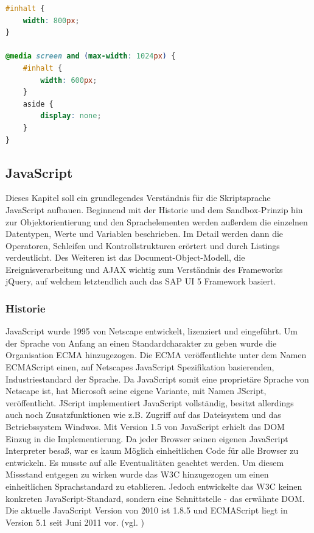 \vspace{1em}
\begin{lstlisting}[language=CSS, caption=CSS3 eigenschaftsspezifisches Stylesheet, label=lst:css3mediaquery]
#inhalt {
	width: 800px;
}
 
@media screen and (max-width: 1024px) {
	#inhalt {
		width: 600px;
	}
	aside {
		display: none;
	}
}
\end{lstlisting}

\subsection{JavaScript}
Dieses Kapitel soll ein grundlegendes Verständnis für die Skriptsprache JavaScript aufbauen. Beginnend mit der Historie und dem Sandbox-Prinzip hin zur Objektorientierung und den Sprachelementen werden außerdem die einzelnen Datentypen, Werte und Variablen beschrieben. Im Detail werden dann die Operatoren, Schleifen und Kontrollstrukturen erörtert und durch Listings verdeutlicht. Des Weiteren ist das Document-Object-Modell, die Ereignisverarbeitung und AJAX wichtig zum Verständnis des Frameworks jQuery, auf welchem letztendlich auch das SAP UI 5 Framework basiert.

\subsubsection{Historie} JavaScript wurde 1995 von Netscape entwickelt, lizenziert und eingeführt. Um der Sprache von Anfang an einen Standardcharakter zu geben wurde die Organisation ECMA hinzugezogen. Die ECMA veröffentlichte unter dem Namen ECMAScript einen, auf Netscapes JavaScript Spezifikation basierenden, Industriestandard der Sprache. Da JavaScript somit eine proprietäre Sprache von Netscape ist, hat Microsoft seine eigene Variante, mit Namen JScript, veröffentlicht. JScript implementiert JavaScript vollständig, besitzt allerdings auch noch Zusatzfunktionen wie z.B. Zugriff auf das Dateisystem und das Betriebssystem Windwos. Mit Version 1.5 von JavaScript erhielt das DOM Einzug in die Implementierung. Da jeder Browser seinen eigenen JavaScript Interpreter besaß, war es kaum Möglich einheitlichen Code für alle Browser zu entwickeln. Es musste auf alle Eventualitäten geachtet werden. Um diesem Missstand entgegen zu wirken wurde das W3C hinzugezogen um einen einheitlichen Sprachstandard zu etablieren. Jedoch entwickelte das W3C keinen konkreten JavaScript-Standard, sondern eine Schnittstelle - das erwähnte DOM. Die aktuelle JavaScript Version von 2010 ist 1.8.5 und ECMAScript liegt in Version 5.1 seit Juni 2011 vor. (vgl. \cite{SelfHtml20146})

